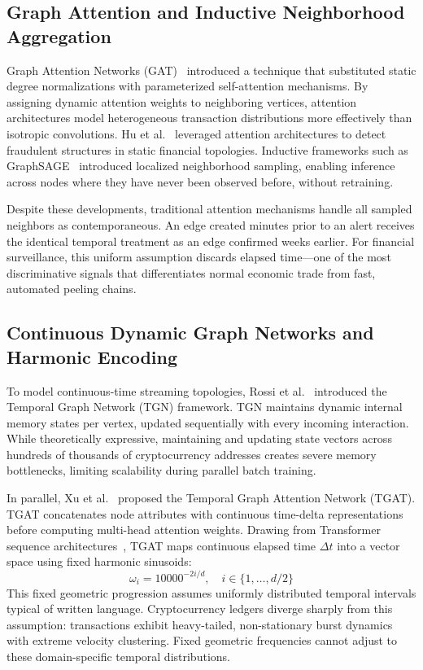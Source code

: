 \subsection{Graph Attention and Inductive Neighborhood Aggregation}

Graph Attention Networks (GAT)~\cite{velivckovic2018gat} introduced a technique that substituted static degree normalizations with parameterized self-attention mechanisms. By assigning dynamic attention weights to neighboring vertices, attention architectures model heterogeneous transaction distributions more effectively than isotropic convolutions. Hu et al.~\cite{hu2020gat} leveraged attention architectures to detect fraudulent structures in static financial topologies. Inductive frameworks such as GraphSAGE~\cite{hamilton2017graphsage} introduced localized neighborhood sampling, enabling inference across nodes where they have never been observed before, without retraining.

Despite these developments, traditional attention mechanisms handle all sampled neighbors as contemporaneous. An edge created minutes prior to an alert receives the identical temporal treatment as an edge confirmed weeks earlier. For financial surveillance, this uniform assumption discards elapsed time---one of the most discriminative signals that differentiates normal economic trade from fast, automated peeling chains.

\subsection{Continuous Dynamic Graph Networks and Harmonic Encoding}

To model continuous-time streaming topologies, Rossi et al.~\cite{rossi2020tgn} introduced the Temporal Graph Network (TGN) framework. TGN maintains dynamic internal memory states per vertex, updated sequentially with every incoming interaction. While theoretically expressive, maintaining and updating state vectors across hundreds of thousands of cryptocurrency addresses creates severe memory bottlenecks, limiting scalability during parallel batch training.

In parallel, Xu et al.~\cite{xu2020tgat} proposed the Temporal Graph Attention Network (TGAT). TGAT concatenates node attributes with continuous time-delta representations before computing multi-head attention weights. Drawing from Transformer sequence architectures~\cite{vaswani2017attention}, TGAT maps continuous elapsed time $\Delta t$ into a vector space using fixed harmonic sinusoids:
\begin{equation}
\omega_i = 10000^{-2i/d}, \quad i \in \{1, \ldots, d/2\}
\end{equation}
This fixed geometric progression assumes uniformly distributed temporal intervals typical of written language. Cryptocurrency ledgers diverge sharply from this assumption: transactions exhibit heavy-tailed, non-stationary burst dynamics with extreme velocity clustering. Fixed geometric frequencies cannot adjust to these domain-specific temporal distributions.

